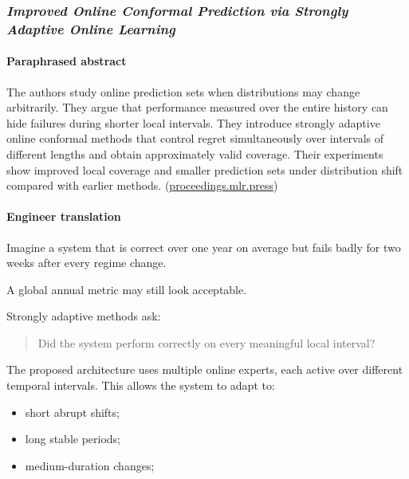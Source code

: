 \subsubsection{\texorpdfstring{\emph{Improved Online Conformal Prediction via Strongly Adaptive Online Learning}}{Improved Online Conformal Prediction via Strongly Adaptive Online Learning}}\label{improved-online-conformal-prediction-via-strongly-adaptive-online-learning}

\paragraph{Paraphrased abstract}\label{paraphrased-abstract-5}

The authors study online prediction sets when distributions may change arbitrarily. They argue that performance measured over the entire history can hide failures during shorter local intervals. They introduce strongly adaptive online conformal methods that control regret simultaneously over intervals of different lengths and obtain approximately valid coverage. Their experiments show improved local coverage and smaller prediction sets under distribution shift compared with earlier methods. (\href{https://proceedings.mlr.press/v202/bhatnagar23a.html}{proceedings.mlr.press})

\paragraph{Engineer translation}\label{engineer-translation-5}

Imagine a system that is correct over one year on average but fails badly for two weeks after every regime change.

A global annual metric may still look acceptable.

Strongly adaptive methods ask:

\begin{quote}
Did the system perform correctly on every meaningful local interval?
\end{quote}

The proposed architecture uses multiple online experts, each active over different temporal intervals. This allows the system to adapt to:

\begin{itemize}
\tightlist
\item
  short abrupt shifts;
\item
  long stable periods;
\item
  medium-duration changes;
\end{itemize}

